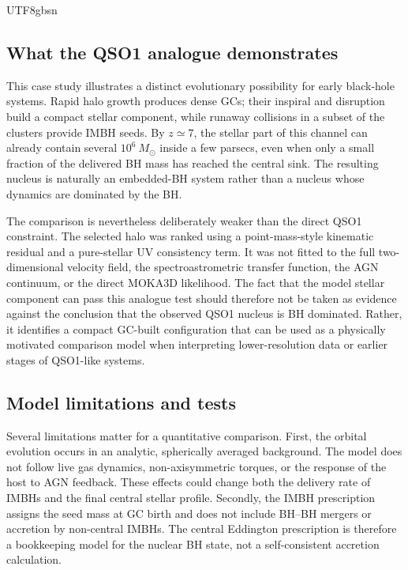 \documentclass[trackchanges, twocolappendix, twocolumn]{aastex701}
\begin{document}
\begin{CJK*}{UTF8}{gbsn}
\subsection{What the QSO1 analogue demonstrates}
\label{subsec:interpretation}

This case study illustrates a distinct evolutionary possibility for early
black-hole systems. Rapid halo growth produces dense GCs; their inspiral and
disruption build a compact stellar component, while runaway collisions in a
subset of the clusters provide IMBH seeds. By $z\simeq7$, the stellar part of
this channel can already contain several $10^6~M_\odot$ inside a few parsecs,
even when only a small fraction of the delivered BH mass has reached the
central sink. The resulting nucleus is naturally an embedded-BH system rather
than a nucleus whose dynamics are dominated by the BH.

The comparison is nevertheless deliberately weaker than the direct QSO1
constraint. The selected halo was ranked using a point-mass-style kinematic
residual and a pure-stellar UV consistency term. It was not fitted to the full
two-dimensional velocity field, the spectroastrometric transfer function, the
AGN continuum, or the direct MOKA3D likelihood. The fact that the model stellar
component can pass this analogue test should therefore not be taken as evidence
against the conclusion that the observed QSO1 nucleus is BH dominated. Rather,
it identifies a compact GC-built configuration that can be used as a physically
motivated comparison model when interpreting lower-resolution data or earlier
stages of QSO1-like systems.

\subsection{Model limitations and tests}
\label{subsec:limitations}

Several limitations matter for a quantitative comparison. First, the orbital
evolution occurs in an analytic, spherically averaged background. The model
does not follow live gas dynamics, non-axisymmetric torques, or the response of
the host to AGN feedback. These effects could change both the delivery rate of
IMBHs and the final central stellar profile. Secondly, the IMBH prescription
assigns the seed mass at GC birth and does not include BH--BH mergers or
accretion by non-central IMBHs. The central Eddington prescription is therefore
a bookkeeping model for the nuclear BH state, not a self-consistent accretion
calculation.


\end{CJK*}
\end{document}
